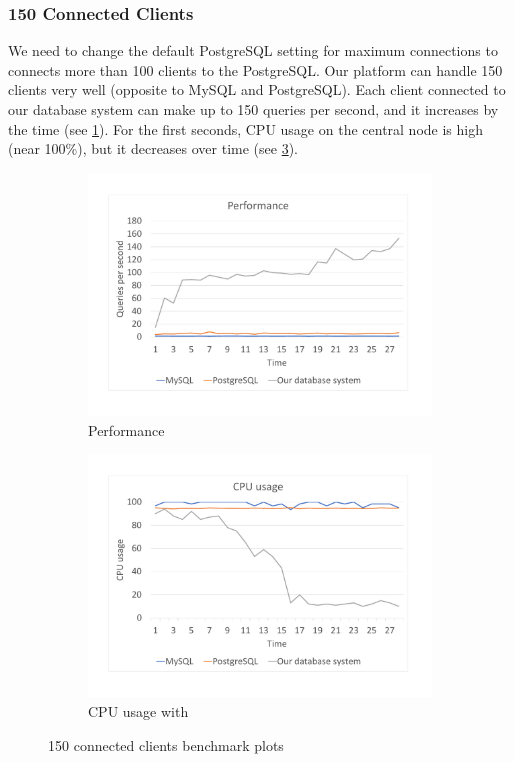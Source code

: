 \subsubsection*{150 Connected Clients}
We need to change the default PostgreSQL setting for maximum connections to connects more than 100 clients to the PostgreSQL. Our platform can handle 150 clients very well (opposite to MySQL and PostgreSQL). Each client connected to our database system can make up to 150 queries per second, and it increases by the time (see \ref{bench150per}). For the first seconds, CPU usage on the central node is high (near 100\%), but it decreases over time (see \ref{bench150cpu}).

\begin{figure}[h]
    \begin{subfigure}{.5\textwidth}
        \centering
        \includegraphics[trim={1.78cm 2cm 2.08cm 1cm},clip,width=1.0\linewidth]{excel/150per.pdf}
        \caption{Performance}
        \label{bench150per}
    \end{subfigure}
    \begin{subfigure}{.5\textwidth}
        \centering
        \includegraphics[trim={1.78cm 2cm 2.08cm 1cm},clip,width=1.0\linewidth]{excel/150cpu.pdf}
        \caption{CPU usage with}
        \label{bench150cpu}
    \end{subfigure}
    \caption{150 connected clients benchmark plots}
\end{figure}

